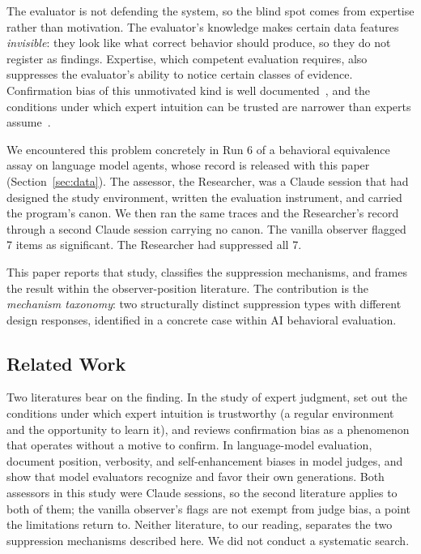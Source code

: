 \documentclass[11pt,a4paper]{article}
\begin{document}
The evaluator is not defending the system, so the blind spot comes from
expertise rather than motivation. The evaluator's knowledge makes certain data
features \emph{invisible}: they look like what correct behavior should produce,
so they do not register as findings. Expertise, which competent evaluation
requires, also suppresses the evaluator's ability to notice certain classes of
evidence. Confirmation bias of this unmotivated kind is well
documented~\citep{nickerson1998}, and the conditions under which expert
intuition can be trusted are narrower than experts assume~\citep{kahneman2009}.

We encountered this problem concretely in Run 6 of a behavioral equivalence
assay on language model agents, whose record is released with this paper
(Section~\ref{sec:data}). The assessor, the Researcher, was a Claude session
that had designed the study environment, written the evaluation instrument,
and carried the program's canon. We then ran the same traces and
the Researcher's record through a second Claude session carrying no canon. The vanilla observer flagged 7
items as significant. The Researcher had suppressed all 7.

This paper reports that study, classifies the suppression mechanisms, and frames
the result within the observer-position literature. The contribution is the
\emph{mechanism taxonomy}: two structurally distinct suppression types with
different design responses, identified in a concrete case within AI behavioral
evaluation.

\subsection{Related Work}

Two literatures bear on the finding. In the study of expert judgment,
\citet{kahneman2009} set out the conditions under which
expert intuition is trustworthy (a regular environment and the opportunity to
learn it), and \citet{nickerson1998} reviews confirmation bias as a
phenomenon that operates without a motive to confirm. In language-model
evaluation, \citet{zheng2023} document position, verbosity, and
self-enhancement biases in model judges, and \citet{panickssery2024} show that model evaluators recognize and favor
their own generations. Both assessors in this study were Claude sessions, so
the second literature applies to both of them; the vanilla observer's flags are
not exempt from judge bias, a point the limitations return to. Neither
literature, to our reading, separates the two suppression mechanisms described
here. We did not conduct a systematic search.
\end{document}

